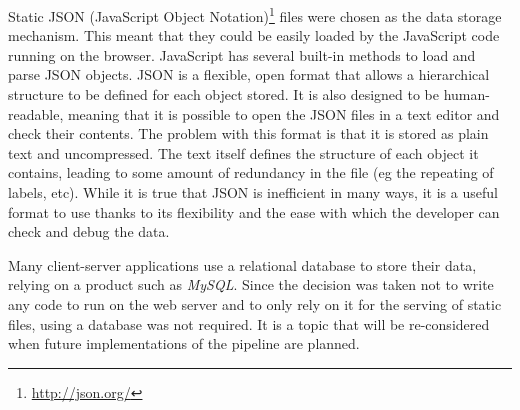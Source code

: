 Static JSON (JavaScript Object Notation)\footnote{\url{http://json.org/}} files were chosen as the data storage mechanism. This meant that they could be easily loaded by the JavaScript code running on the browser. JavaScript has several built-in methods to load and parse JSON objects. JSON is a flexible, open format that allows a hierarchical structure to be defined for each object stored. It is also designed to be human-readable, meaning that it is possible to open the JSON files in a text editor and check their contents. The problem with this format is that it is stored as plain text and uncompressed. The text itself defines the structure of each object it contains, leading to some amount of redundancy in the file (eg the repeating of labels, etc). While it is true that JSON is inefficient in many ways, it is a useful format to use thanks to its flexibility and the ease with which the developer can check and debug the data. 

Many client-server applications use a relational database to store their data, relying on a product such as \emph{MySQL}. Since the decision was taken not to write any code to run on the web server and to only rely on it for the serving of static files, using a database was not required. It is a topic that will be re-considered when future implementations of the pipeline are planned. 

